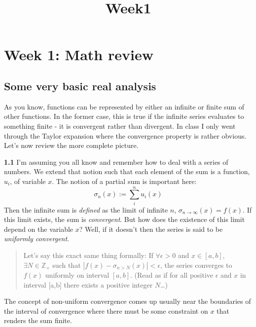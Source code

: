 \documentclass[11pt]{article}
\title{Week1}
\begin{document}
    
    \maketitle
    
    

    
    \hypertarget{week-1-math-review}{%
\section{Week 1: Math review}\label{week-1-math-review}}

\hypertarget{some-very-basic-real-analysis}{%
\subsection{Some very basic real
analysis}\label{some-very-basic-real-analysis}}

As you know, functions can be represented by either an infinite or
finite sum of other functions. In the former case, this is true if the
infinite series evaluates to something finite - it is convergent rather
than divergent. In class I only went through the Taylor expansion where
the convergence property is rather obvious. Let's now review the more
complete picture.

\textbf{1.1} I'm assuming you all know and remember how to deal with a
series of numbers. We extend that notion such that each element of the
sum is a function, \(u_i\), of variable \(x\). The notion of a partial
sum is important here: \[
\sigma_n(x):=\sum^n_iu_i(x)
\] Then the infinite sum is \emph{defined} as the limit of infinite
\(n\), \(\sigma_{n\to \infty}(x)=f(x)\). If this limit exists, the sum
is \emph{convergent}. But how does the existence of this limit depend on
the variable \(x\)? Well, if it doesn't then the series is said to be
\emph{uniformly convergent}.

\begin{quote}
Let's say this exact same thing formally: If \(\forall \epsilon>0\) and
\(x\in[a,b]\), \(\exists N\in \mathbb{Z}_+\) such that
\(|f(x)-\sigma_{n>N}(x)|<\epsilon\), the series converges to \(f(x)\)
uniformly on interval \([a,b]\). (Read as if for all positive
\(\epsilon\) and \(x\) in interval {[}a,b{]} there exists a positive
integer \(N\)\ldots)
\end{quote}

The concept of non-uniform convergence comes up usually near the
boundaries of the interval of convergence where there must be some
constraint on \(x\) that renders the sum finite.
\end{document}

